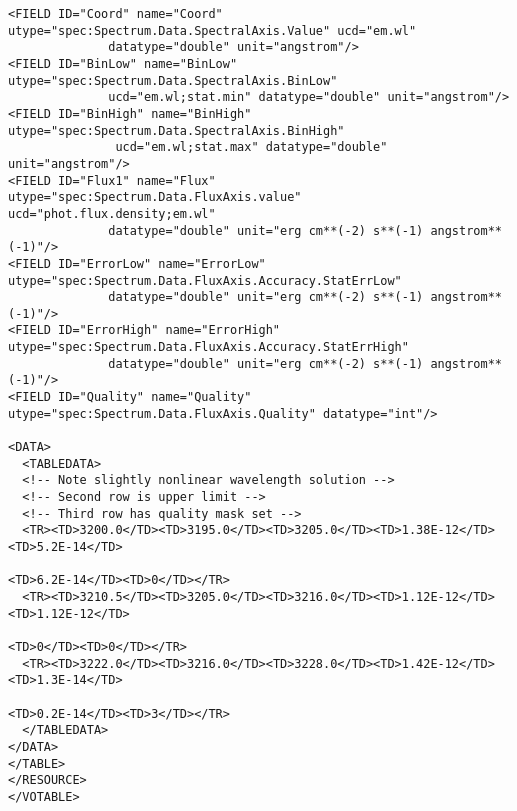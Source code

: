{\begin{flushleft}
\begin{fmpage}
\begin{verbatim}
<FIELD ID="Coord" name="Coord" utype="spec:Spectrum.Data.SpectralAxis.Value" ucd="em.wl"
              datatype="double" unit="angstrom"/>
<FIELD ID="BinLow" name="BinLow" utype="spec:Spectrum.Data.SpectralAxis.BinLow" 
              ucd="em.wl;stat.min" datatype="double" unit="angstrom"/>
<FIELD ID="BinHigh" name="BinHigh" utype="spec:Spectrum.Data.SpectralAxis.BinHigh"
               ucd="em.wl;stat.max" datatype="double" unit="angstrom"/>
<FIELD ID="Flux1" name="Flux" utype="spec:Spectrum.Data.FluxAxis.value" ucd="phot.flux.density;em.wl"
              datatype="double" unit="erg cm**(-2) s**(-1) angstrom**(-1)"/>
<FIELD ID="ErrorLow" name="ErrorLow" utype="spec:Spectrum.Data.FluxAxis.Accuracy.StatErrLow" 
              datatype="double" unit="erg cm**(-2) s**(-1) angstrom**(-1)"/>
<FIELD ID="ErrorHigh" name="ErrorHigh" utype="spec:Spectrum.Data.FluxAxis.Accuracy.StatErrHigh" 
              datatype="double" unit="erg cm**(-2) s**(-1) angstrom**(-1)"/>
<FIELD ID="Quality" name="Quality" utype="spec:Spectrum.Data.FluxAxis.Quality" datatype="int"/>

<DATA>
  <TABLEDATA>
  <!-- Note slightly nonlinear wavelength solution -->
  <!-- Second row is upper limit -->
  <!-- Third row has quality mask set -->
  <TR><TD>3200.0</TD><TD>3195.0</TD><TD>3205.0</TD><TD>1.38E-12</TD><TD>5.2E-14</TD>
                                                                        <TD>6.2E-14</TD><TD>0</TD></TR>
  <TR><TD>3210.5</TD><TD>3205.0</TD><TD>3216.0</TD><TD>1.12E-12</TD><TD>1.12E-12</TD>
                                                                              <TD>0</TD><TD>0</TD></TR>
  <TR><TD>3222.0</TD><TD>3216.0</TD><TD>3228.0</TD><TD>1.42E-12</TD><TD>1.3E-14</TD>
                                                                        <TD>0.2E-14</TD><TD>3</TD></TR>
  </TABLEDATA>
</DATA>
</TABLE>
</RESOURCE>
</VOTABLE>

\end{verbatim}
\end{fmpage}
\end{flushleft}
}

